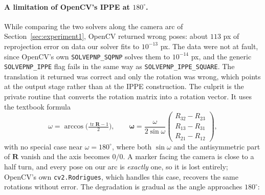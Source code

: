 \documentclass[11pt,a4paper]{article}
\theoremstyle{definition}
\theoremstyle{plain}
\theoremstyle{remark}
\newcommand{\code}[1]{\texttt{#1}}
\newcommand{\flag}{\texttt{SOLVEPNP\allowbreak\_IPPE\allowbreak\_SQUARE}}
\begin{document}

\paragraph{A limitation of OpenCV's IPPE at $180^\circ$.} While comparing the
two solvers along the camera arc of Section~\ref{sec:experiment1}, OpenCV
returned wrong poses: about $113$ px of reprojection error on data our solver
fits to $10^{-13}$ px. The data were not at fault, since OpenCV's own
\code{SOLVEPNP\_SQPNP} solves them to $10^{-14}$ px, and the generic
\code{SOLVEPNP\_IPPE} flag fails in the same way as \flag. The translation it
returned was correct and only the rotation was wrong, which points at the
output stage rather than at the IPPE construction. The culprit is the private
routine that converts the rotation matrix into a rotation vector. It uses the
textbook formula
\begin{equation}
  \omega = \arccos\!\Big(\tfrac{\operatorname{tr}\mathbf{R}-1}{2}\Big),
  \qquad
  \boldsymbol{\omega}
  = \frac{\omega}{2\sin\omega}
    \begin{pmatrix}
      R_{32}-R_{23}\\ R_{13}-R_{31}\\ R_{21}-R_{12}
    \end{pmatrix},
\end{equation}
with no special case near $\omega=180^\circ$, where both $\sin\omega$ and the
antisymmetric part of $\mathbf{R}$ vanish and the axis becomes $0/0$. A marker
facing the camera is close to a half turn, and every pose on our arc is
\emph{exactly} one, so it is lost entirely; OpenCV's own \code{cv2.Rodrigues},
which handles this case, recovers the same rotations without error. The
degradation is gradual as the angle approaches $180^\circ$:
\end{document}
